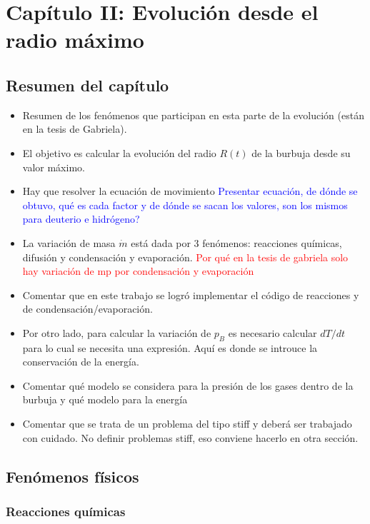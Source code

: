 \documentclass[aps,prb,twocolumn,superscriptaddress,floatfix,longbibliography,10pt]{revtex4-2}
\newcounter{para}
\begin{document}
\section*{Capítulo II: Evolución desde el radio máximo}

\subsection{Resumen del capítulo}



\begin{itemize}
  \item Resumen de los fenómenos que participan en esta parte de la evolución (están en la tesis de Gabriela).
  \item El objetivo es calcular la evolución del radio $R(t)$ de la burbuja desde su valor máximo.
  \item Hay que resolver la ecuación de movimiento \textcolor{blue}{Presentar ecuación, de dónde se obtuvo, qué es cada factor y de dónde se sacan los valores, son los mismos para deuterio e hidrógeno?}
  \item La variación de masa $\dot{m}$ está dada por 3 fenómenos: reacciones químicas, difusión y condensación y evaporación. \textcolor{red}{Por qué en la tesis de gabriela solo hay variación de mp por condensación y evaporación}
  \item Comentar que en este trabajo se logró implementar el código de reacciones y de condensación/evaporación.
  \item Por otro lado, para calcular la variación de $p_B$ es necesario calcular $dT/dt$ para lo cual se necesita una expresión. Aquí es donde se introuce la conservación de la energía.
  \item Comentar qué modelo se considera para la presión de los gases dentro de la burbuja y qué modelo para la energía
  \item Comentar que se trata de un problema del tipo stiff y deberá ser trabajado con cuidado. No definir problemas stiff, eso conviene hacerlo en otra sección.
\end{itemize}

\subsection{Fenómenos físicos}

\subsubsection{Reacciones químicas}
\end{document}
